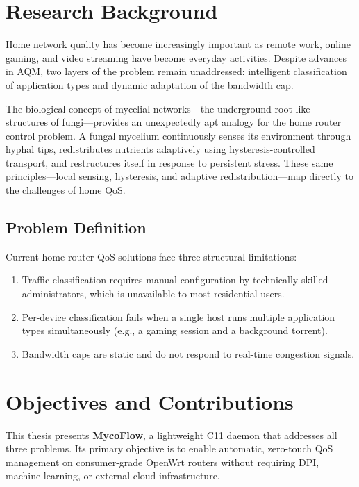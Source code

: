 \section{Research Background}

Home network quality has become increasingly important as remote work, online gaming, and video streaming have become everyday activities. Despite advances in AQM, two layers of the problem remain unaddressed: intelligent classification of application types and dynamic adaptation of the bandwidth cap.

The biological concept of mycelial networks---the underground root-like structures of fungi---provides an unexpectedly apt analogy for the home router control problem. A fungal mycelium continuously senses its environment through hyphal tips, redistributes nutrients adaptively using hysteresis-controlled transport, and restructures itself in response to persistent stress. These same principles---local sensing, hysteresis, and adaptive redistribution---map directly to the challenges of home QoS.

\subsection{Problem Definition}

Current home router QoS solutions face three structural limitations:

\begin{enumerate}
  \item Traffic classification requires manual configuration by technically skilled administrators, which is unavailable to most residential users.
  \item Per-device classification fails when a single host runs multiple application types simultaneously (e.g., a gaming session and a background torrent).
  \item Bandwidth caps are static and do not respond to real-time congestion signals.
\end{enumerate}

\section{Objectives and Contributions}

This thesis presents \textbf{MycoFlow}, a lightweight C11 daemon that addresses all three problems. Its primary objective is to enable automatic, zero-touch QoS management on consumer-grade OpenWrt routers without requiring DPI, machine learning, or external cloud infrastructure.

